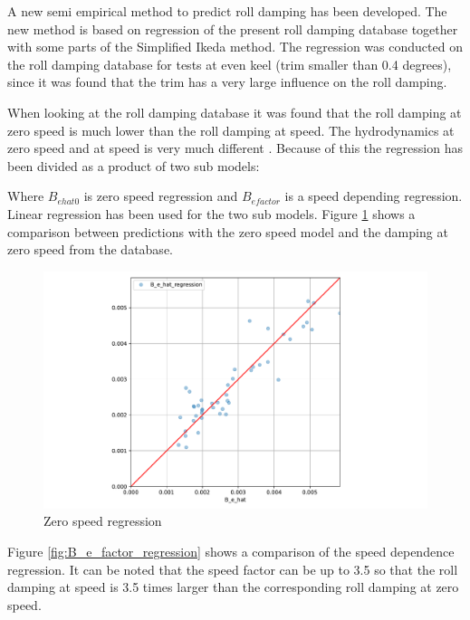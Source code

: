 A new semi empirical method to predict roll damping has been developed. The new method is based on regression of the present roll damping database together with some parts of the Simplified Ikeda method.  The regression was conducted on the roll damping database for tests at even keel (trim smaller than 0.4 degrees), since it was found that the trim has a very large influence on the roll damping. 

When looking at the roll damping database it was found that the roll damping at zero speed is much lower than the roll damping at speed. The hydrodynamics at zero speed and at speed is very much different \cite{ikeda_velocity_1979}. Because of this the regression has been divided as a product of two sub models:

Where $B_{ehat0}$ is zero speed regression and $B_{efactor}$ is a speed depending regression. Linear regression has been used for the two sub models. Figure \ref{fig:B_e_hat0_regression} shows a comparison between predictions with the zero speed model and the damping at zero speed from the database.

\begin{figure}[H]
    \centering
    \includegraphics[width=\columnwidth]{figures/B_e_hat0_regression.pdf}
    \caption{Zero speed regression}
    \label{fig:B_e_hat0_regression}
\end{figure}

Figure \ref{fig:B_e_factor_regression} shows a comparison of the speed dependence regression. It can be noted that the speed factor can be up to 3.5 so that the roll damping at speed is 3.5 times larger than the corresponding roll damping at zero speed.

